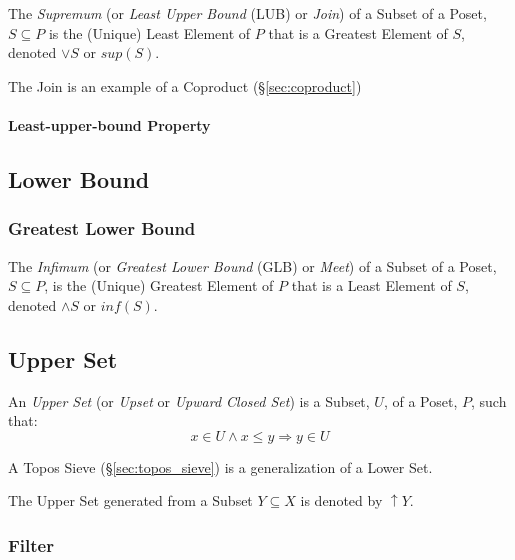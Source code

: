 The \emph{Supremum} (or \emph{Least Upper Bound} (LUB) or \emph{Join})
of a Subset of a Poset, $S \subseteq P$ is the (Unique) Least Element
of $P$ that is a Greatest Element of $S$, denoted $\vee S$ or $sup
(S)$.

The Join is an example of a Coproduct (\S\ref{sec:coproduct})



\paragraph{Least-upper-bound Property}\label{sec:leastupperbound_property}\hfill



\subsection{Lower Bound}\label{sec:lower_bound}

\subsubsection{Greatest Lower Bound}\label{sec:greatest_lowerbound}

The \emph{Infimum} (or \emph{Greatest Lower Bound} (GLB) or
\emph{Meet}) of a Subset of a Poset, $S \subseteq P$, is the (Unique)
Greatest Element of $P$ that is a Least Element of $S$, denoted
$\wedge S$ or $inf (S)$.



\subsection{Upper Set}\label{sec:upper_set}

An \emph{Upper Set} (or \emph{Upset} or \emph{Upward Closed Set}) is a
Subset, $U$, of a Poset, $P$, such that:
\[
  x \in U \wedge x \leq y \Rightarrow y \in U
\]

A Topos Sieve (\S\ref{sec:topos_sieve}) is a generalization of a Lower
Set.

The Upper Set generated from a Subset $Y \subseteq X$ is denoted by
$\uparrow Y$.



\subsubsection{Filter}\label{sec:filter}

